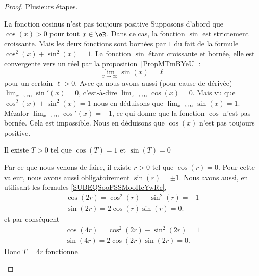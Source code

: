 \begin{proof}
    Plusieurs étapes.
    \begin{subproof}
        \item[La fonction cosinus n'est pas toujours positive]
    Supposons d'abord que \( \cos(x)>0\) pour tout \( x\in \eR\). Dans ce cas, la fonction \( \sin\) est strictement croissante. Mais les deux fonctions sont bornées par \( 1\) du fait de la formule \( \cos^2(x)+\sin^2(x)=1\). La fonction \( \sin\) étant croissante et bornée, elle est convergente vers un réel par la proposition~\ref{PropMTmBYeU} :
    \begin{equation}
        \lim_{x\to \infty} \sin(x)=\ell
    \end{equation}
    pour un certain \( \ell>0\). Avec ça nous avons aussi (pour cause de dérivée) \( \lim_{x\to \infty} \sin'(x)=0\), c'est-à-dire \( \lim_{x\to \infty} \cos(x)=0\). Mais vu que \( \cos^2(x)+\sin^2(x)=1\) nous en déduisons que \( \lim_{x\to \infty} \sin(x)=1\). Mézalor \( \lim_{x\to \infty} \cos'(x)=-1\), ce qui donne que la fonction \( \cos\) n'est pas bornée. Cela est impossible. Nous en déduisons que \( \cos(x)\) n'est pas toujours positive.

\item[Il existe \( T>0\) tel que \( \cos(T)=1\) et \( \sin(T)=0\)]

    Par ce que nous venons de faire, il existe \( r>0\) tel que \( \cos(r)=0\). Pour cette valeur, nous avons aussi obligatoirement \( \sin(r)=\pm 1\). Nous avons aussi, en utilisant les formules \eqref{SUBEQSooFSSMooHcYwRc},
    \begin{subequations}
        \begin{align}
            \cos(2r)=\cos^2(r)-\sin^2(r)=-1\\
            \sin(2r)=2\cos(r)\sin(r)=0.
        \end{align}
    \end{subequations}
    et par conséquent
    \begin{subequations}
        \begin{align}
            \cos(4r)=\cos^2(2r)-\sin^2(2r)=1\\
            \sin(4r)=2\cos(2r)\sin(2r)=0.
        \end{align}
    \end{subequations}
    Donc \( T=4r\) fonctionne.


\end{subproof}
\end{proof}
